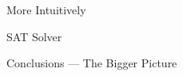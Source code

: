 \documentclass[11pt]{beamer}
\begin{document}
\begin{frame}{More Intuitively}

\begin{center}
\end{center}

\end{frame}

\begin{frame}{SAT Solver}

\begin{center}
\end{center}  

\begin{center}
\end{center}  

\end{frame}

\begin{frame}{}

{\Large \centerline{Conclusions --- The Bigger Picture}}

\end{frame}
\end{document}
